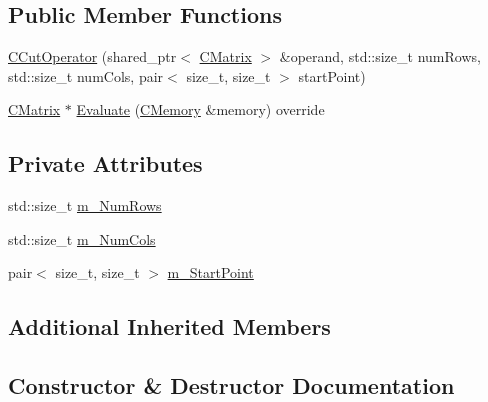 \subsection*{Public Member Functions}
\begin{DoxyCompactItemize}
\item 
\hyperlink{classCCutOperator_a821d6a50def27608e635434e3ca73432}{C\+Cut\+Operator} (shared\+\_\+ptr$<$ \hyperlink{classCMatrix}{C\+Matrix} $>$ \&operand, std\+::size\+\_\+t num\+Rows, std\+::size\+\_\+t num\+Cols, pair$<$ size\+\_\+t, size\+\_\+t $>$ start\+Point)
\item 
\hyperlink{classCMatrix}{C\+Matrix} $\ast$ \hyperlink{classCCutOperator_a146755b24696c85270885bb71c29d82d}{Evaluate} (\hyperlink{classCMemory}{C\+Memory} \&memory) override
\end{DoxyCompactItemize}
\subsection*{Private Attributes}
\begin{DoxyCompactItemize}
\item 
std\+::size\+\_\+t \hyperlink{classCCutOperator_af8d34f5712a90c9969823f75a719dc1b}{m\+\_\+\+Num\+Rows}
\item 
std\+::size\+\_\+t \hyperlink{classCCutOperator_a79665dc45c36827946d70561b17972e1}{m\+\_\+\+Num\+Cols}
\item 
pair$<$ size\+\_\+t, size\+\_\+t $>$ \hyperlink{classCCutOperator_aa58b7138e83bd58cc64f8fac3325ce80}{m\+\_\+\+Start\+Point}
\end{DoxyCompactItemize}
\subsection*{Additional Inherited Members}


\subsection{Constructor \& Destructor Documentation}
